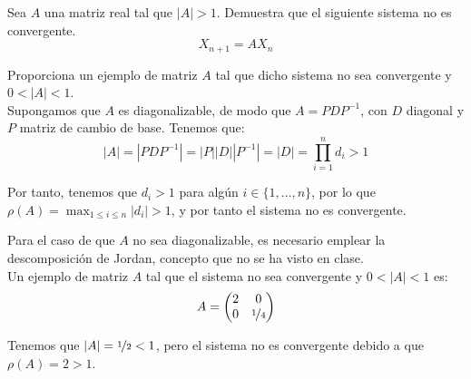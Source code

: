 \begin{ejercicio}
    Sea $A$ una matriz real tal que $|A| > 1$. Demuestra que el siguiente sistema no es convergente.
    \begin{equation*}
    X_{n+1} = AX_n
    \end{equation*}
    
    Proporciona un ejemplo de matriz $A$ tal que dicho sistema no sea convergente y $0 < |A| < 1$.\\

    Supongamos que $A$ es diagonalizable, de modo que $A = PDP^{-1}$, con $D$ diagonal y $P$ matriz de cambio de base.
    Tenemos que:
    \begin{equation*}
        |A| = |PDP^{-1}| = |P||D||P^{-1}| = |D| = \prod_{i=1}^n d_i > 1
    \end{equation*}

    Por tanto, tenemos que $d_i > 1$ para algún $i\in \{1,\ldots,n\}$, por lo que
    $\rho(A) = \max_{1\leq i\leq n} |d_i| > 1$, y por tanto el sistema no es convergente.

    Para el caso de que $A$ no sea diagonalizable, es necesario emplear
    la descomposición de Jordan, concepto que no se ha visto en clase.\\

    Un ejemplo de matriz $A$ tal que el sistema no sea convergente y $0 < |A| < 1$ es:
    \begin{equation*}
        A = \begin{pmatrix}
            2 & 0\\
            0 & \nicefrac{1}{4}
        \end{pmatrix}
    \end{equation*}

    Tenemos que $|A| = \nicefrac{1}{2} < 1$, pero el sistema no es convergente debido a
    que $\rho(A) = 2 > 1$.
\end{ejercicio}

